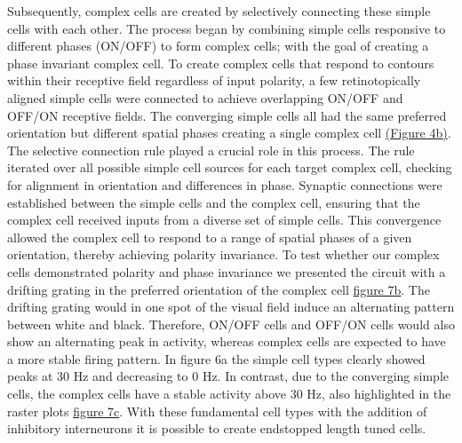 \documentclass[12pt]{article}
\begin{document}
Subsequently, complex cells are created by selectively connecting these simple cells with each other. The process began by combining simple cells responsive to different phases (ON/OFF) to form complex cells; with the goal of creating a phase invariant complex cell. To create complex cells that respond to contours within their receptive field regardless of input polarity, a few retinotopically aligned simple cells were connected to achieve overlapping ON/OFF and OFF/ON receptive fields. The converging simple cells all had the same preferred orientation but different spatial phases creating a single complex cell \hyperref[fig:LIF_Overview]{(Figure 4b)}. The selective connection rule played a crucial role in this process. The rule iterated over all possible simple cell sources for each target complex cell, checking for alignment in orientation and differences in phase. Synaptic connections were established between the simple cells and the complex cell, ensuring that the complex cell received inputs from a diverse set of simple cells. This convergence allowed the complex cell to respond to a range of spatial phases of a given orientation, thereby achieving polarity invariance. To test whether our complex cells demonstrated polarity and phase invariance we presented the circuit with a drifting grating in the preferred orientation of the complex cell \hyperref[fig:polarity invariance]{figure 7b}. The drifting grating would in one spot of the visual field induce an alternating pattern between white and black. Therefore, ON/OFF cells and OFF/ON cells would also show an alternating peak in activity, whereas complex cells are expected to have a more stable firing pattern. In figure 6a the simple cell types clearly showed peaks at 30 Hz and decreasing to 0 Hz. In contrast, due to the converging simple cells, the complex cells have a stable activity above 30 Hz, also highlighted in the raster plots \hyperref[fig:polarity invariance]{figure 7c}. With these fundamental cell types with the addition of inhibitory interneurons it is possible to create endstopped length tuned cells. 
\end{document}
